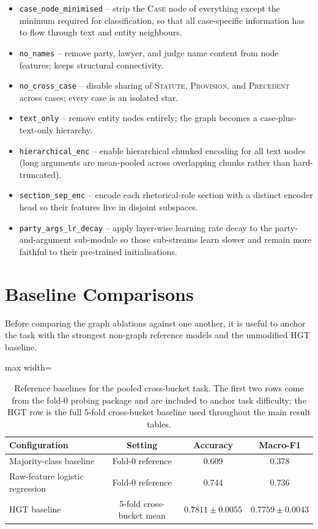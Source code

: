 \begin{itemize}
  \item \texttt{case\_node\_minimised} -- strip the \textsc{Case}
    node of everything except the minimum required for classification,
    so that all case-specific information has to flow through text
    and entity neighbours.
  \item \texttt{no\_names} -- remove party, lawyer, and judge name
    content from node features; keeps structural connectivity.
  \item \texttt{no\_cross\_case} -- disable sharing of \textsc{Statute},
    \textsc{Provision}, and \textsc{Precedent} across cases; every
    case is an isolated star.
  \item \texttt{text\_only} -- remove entity nodes entirely; the
    graph becomes a case-plus-text-only hierarchy.
  \item \texttt{hierarchical\_enc} -- enable hierarchical chunked
    encoding for all text nodes (long arguments are mean-pooled across
    overlapping chunks rather than hard-truncated).
  \item \texttt{section\_sep\_enc} -- encode each rhetorical-role
    section with a distinct encoder head so their features live in
    disjoint subspaces.
  \item \texttt{party\_args\_lr\_decay} -- apply layer-wise learning
    rate decay to the party-and-argument sub-module so those
    sub-streams learn slower and remain more faithful to their
    pre-trained initialisations.
\end{itemize}

\section{Baseline Comparisons}

Before comparing the graph ablations against one another, it is useful
to anchor the task with the strongest non-graph reference models and
the unmodified HGT baseline.

{
\begin{table}[H]
  \centering
  \small
  \begin{adjustbox}{max width=\textwidth}
  \begin{tabular}{lccc}
    \toprule
    Configuration & Setting & Accuracy & Macro-F1 \\
    \midrule
    Majority-class baseline & Fold-0 reference & 0.609 & 0.378 \\
    Raw-feature logistic regression & Fold-0 reference & 0.744 & 0.736 \\
    HGT baseline & 5-fold cross-bucket mean & $0.7811\pm0.0055$ & $0.7759\pm0.0043$ \\
    \bottomrule
  \end{tabular}
  \end{adjustbox}
  \caption{{Reference baselines for the pooled
  cross-bucket task. The first two rows come from the fold-0 probing
  package and are included to anchor task difficulty; the HGT row is
  the full 5-fold cross-bucket baseline used throughout the main result
  tables.}}
  \label{tab:baseline_references}
\end{table}
}

